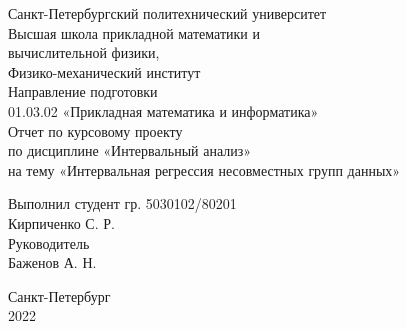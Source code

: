 \documentclass[a4paper]{article}
\begin{document}
\large
\begin{center}
    Санкт-Петербургский политехнический университет\\
    Высшая школа прикладной математики и\\вычислительной физики,\\ 
    Физико-механический институт\\
    \vspace{3em}
    Направление подготовки\\
    01.03.02 «Прикладная математика и информатика»\\
    \vspace{10em}
    \Large
    Отчет по курсовому проекту \\
    по дисциплине «Интервальный анализ»\\
    на тему «Интервальная регрессия несовместных групп данных»
    \vspace{17em}
    \large
\end{center}
Выполнил студент гр. 5030102/80201\\
Кирпиченко С. Р.\\
Руководитель\\
Баженов А. Н.
\vspace{10.5em}
\begin{center}
    Санкт-Петербург\\
    2022
\end{center}
\thispagestyle{empty}
\newpage
\tableofcontents
{}
\newpage
\listoffigures
{}
\newpage
\listoftables
{}
\newpage
\end{document}
